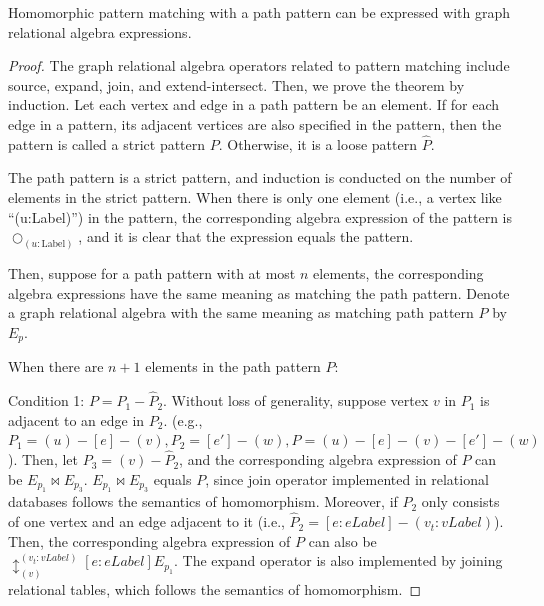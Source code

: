 \begin{theorem}
    Homomorphic pattern matching with a path pattern can be expressed with graph relational algebra expressions.
\end{theorem}
\begin{proof}
    The graph relational algebra operators related to pattern matching include source, expand, join, and extend-intersect.
    Then, we prove the theorem by induction.
    Let each vertex and edge in a path pattern be an element.
    If for each edge in a pattern, its adjacent vertices are also specified in the pattern, then the pattern is called a strict pattern $P$.
    Otherwise, it is a loose pattern $\hat{P}$.

    The path pattern is a strict pattern, and induction is conducted on the number of elements in the strict pattern.
    When there is only one element (i.e., a vertex like ``(u:Label)'') in the pattern, the corresponding algebra expression of the pattern is $\bigcirc_{(u:\text{Label})}$, and it is clear that the expression equals the pattern.

    Then, suppose for a path pattern with at most $n$ elements, the corresponding algebra expressions have the same meaning as matching the path pattern.
    Denote a graph relational algebra with the same meaning as matching path pattern $P$ by $E_p$.

    When there are $n + 1$ elements in the path pattern $P$:



    Condition 1: $P = P_1 - \hat{P}_2$.
    Without loss of generality, suppose vertex $v$ in $P_1$ is adjacent to an edge in $P_2$.
    (e.g., $P_1 = (u)-[e]-(v), P_2 = [e']-(w), P = (u)-[e]-(v)-[e']-(w)$).
    Then, let $P_3 = (v)-\hat{P}_2$, and the corresponding algebra expression of $P$ can be $E_{p_1} \Join E_{p_3}$.
    $E_{p_1} \Join E_{p_3}$ equals $P$, since join operator implemented in relational databases follows the semantics of homomorphism.
    Moreover, if $\hat{P}_2$ only consists of one vertex and an edge adjacent to it (i.e., $\hat{P}_2 = [e:eLabel]-(v_t:vLabel)$).
    Then, the corresponding algebra expression of $P$ can also be $\updownarrow_{(v)}^{(v_t:vLabel)}[e:eLabel]E_{p_1}$.
    The expand operator is also implemented by joining relational tables, which follows the semantics of homomorphism.


\end{proof}
